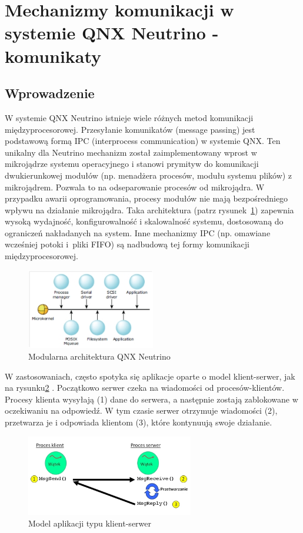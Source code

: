 \section{Mechanizmy komunikacji w systemie QNX Neutrino - komunikaty}

\subsection{Wprowadzenie}

W systemie QNX Neutrino istnieje wiele różnych metod komunikacji międzyprocesorowej. Przesyłanie komunikatów (message passing) jest podstawową formą IPC (interprocess communication) w systemie QNX. Ten unikalny dla Neutrino mechanizm został zaimplementowany wprost w mikrojądrze systemu operacyjnego i stanowi prymityw do komunikacji dwukierunkowej modułów (np. menadżera procesów, modułu systemu plików) z mikrojądrem. Pozwala to na odseparowanie procesów od mikrojądra. W przypadku awarii oprogramowania, procesy modułów nie mają bezpośredniego wpływu na działanie mikrojądra. Taka architektura (patrz rysunek~\ref{fig:microkernel}) zapewnia wysoką wydajność, konfigurowalność i skalowalność systemu, dostosowaną do ograniczeń nakładanych na system. Inne mechanizmy IPC (np. omawiane wcześniej potoki i~pliki FIFO) są nadbudową tej formy komunikacji międzyprocesorowej. 


\begin{figure}[!h]
\centering
\includegraphics[width=0.5\textwidth]{img/microkernel}
\caption{Modularna architektura QNX Neutrino}
\label{fig:microkernel}
\end{figure}

W zastosowaniach, często spotyka się aplikacje oparte o model klient-serwer, jak na rysunku\ref{fig:clientserver}
. Początkowo serwer czeka na wiadomości od procesów-klientów. Procesy klienta wysyłają (1) dane do serwera, a następnie zostają zablokowane w oczekiwaniu na odpowiedź. W tym czasie serwer otrzymuje wiadomości (2), przetwarza je i odpowiada klientom (3), które kontynuują swoje działanie.

\begin{figure}[!h]
\centering
\includegraphics[width=0.65\textwidth]{img/clientserver}
\caption{Model aplikacji typu klient-serwer}
\label{fig:clientserver}
\end{figure}

